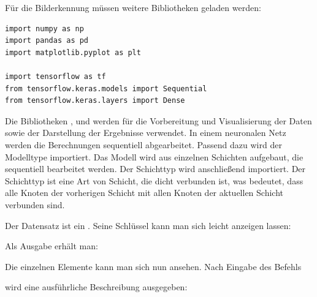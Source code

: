 Für die Bilderkennung müssen weitere Bibliotheken geladen werden:

\begin{code}
    \begin{lstlisting}[numbers=none]
import numpy as np
import pandas as pd
import matplotlib.pyplot as plt

import tensorflow as tf
from tensorflow.keras.models import Sequential
from tensorflow.keras.layers import Dense
\end{lstlisting}
\caption{Bibliotheken für Hello World 2 - Iris}
\end{code}


Die Bibliotheken ,  und  werden für die Vorbereitung und Visualisierung der Daten sowie der Darstellung der Ergebnisse verwendet. In einem neuronalen Netz werden die Berechnungen sequentiell abgearbeitet. Passend dazu wird der Modelltype  importiert. Das Modell wird aus einzelnen Schichten aufgebaut, die sequentiell bearbeitet werden. Der Schichttyp  wird anschließend importiert. Der Schichttyp  ist eine Art von Schicht, die \glqq dicht\grqq{} verbunden ist, was bedeutet, dass alle Knoten der vorherigen Schicht mit allen Knoten der aktuellen Schicht verbunden sind.


Der Datensatz ist ein . Seine Schlüssel kann man sich leicht anzeigen lassen:

\medskip


\medskip

Als Ausgabe erhält man:

\medskip


\medskip

Die einzelnen Elemente kann man sich nun ansehen. Nach Eingabe des Befehls 

\medskip


\medskip
wird eine ausführliche Beschreibung ausgegeben:

